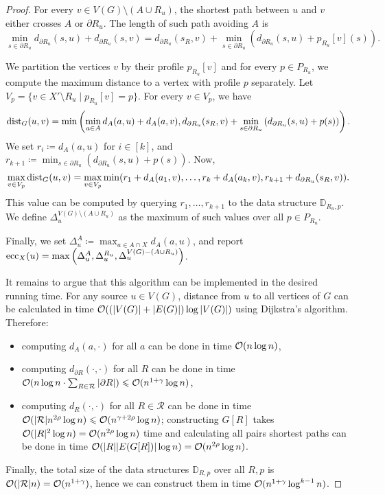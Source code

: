 \begin{proof}
    For every $v \in V(G) \setminus (A \cup R_u)$, the shortest path between $u$ and $v$ either crosses $A$ or $\partial R_u$. The length of such path avoiding $A$ is
    $$ \min_{s \in \partial R_u} d_{\partial R_u}(s, u) + d_{\partial R_u}(s, v) = 
       d_{\partial R_u}(s_R, v) + \min_{s \in \partial R_u} \left( d_{\partial R_u}(s, u) + p_{R_u}[v](s) \right). $$

We partition the vertices $v$ by their profile $p_{R_u}[v]$ and for every $p \in P_{R_u}$, we compute the maximum distance to a vertex with profile $p$ separately. Let $V_p = \{ v \in X' \setminus R_u \mid p_{R_u}[v] = p \}$. For every $v \in V_p$, we have
    $$ \mathrm{dist}_G(u, v) = \min \left( \min_{a \in A} d_A(a, u) + d_A(a, v), d_{\partial R_u}(s_R, v) + \min_{s \in \partial R_u} \left( d_{\partial R_u}(s, u) + p(s) \right) \right). $$
    We set $r_i \coloneqq d_A(a, u)$ for $i \in [k]$, and $r_{k + 1} \coloneqq \min_{s \in \partial R_u}  \left( d_{\partial R_u}(s, u) + p(s) \right)$. Now,
    $$ \max_{v \in V_p} \mathrm{dist}_G(u, v) = \max_{v \in V_p} \min(r_1 + d_A(a_1, v), \dots, r_k + d_A(a_k, v), r_{k + 1} + d_{\partial R_u}(s_R, v)).$$
    This value can be computed by querying $r_1, \dots, r_{k + 1}$ to the data structure $\mathbb{D}_{R_u, p}$. We define $\Delta^{V(G) \setminus (A \cup R_u)}_u$ as the maximum of such values over all $p \in P_{R_u}$.
    
    Finally, we set $\Delta^{A}_u \coloneqq \max_{a \in A \cap X} d_A(a, u)$, and report $\mathrm{ecc}_X(u) = \max \left(\Delta^{A}_u, \Delta^{R_u}_u, \Delta^{V(G) - (A \cup R_u)}_u \right)$.
    
    It remains to argue that this algorithm can be implemented in the desired running time. For any source $u \in V(G)$, distance from $u$ to all vertices of $G$ can be calculated in time $\mathcal{O}((|V(G)| + |E(G)|) \log |V(G)|)$ using Dijkstra's algorithm. Therefore:
    \begin{itemize}[nosep]
        \item computing $d_A(a,\cdot)$ for all $a$ can be done in time $\mathcal{O} (n \log n)$,
        \item computing $d_{\partial R}(\cdot,\cdot)$ for all $R$ can be done in time $\mathcal{O} (n\log n \cdot \sum_{R \in \mathcal{R}} |\partial R| ) \leqslant \mathcal{O} (n^{1 + \gamma} \log n)$,
        \item computing $d_R(\cdot,\cdot)$ for all $R \in \mathcal{R}$ can be done in time $\mathcal{O} (|\mathcal{R}| n^{2\rho} \log n) \leqslant \mathcal{O} (n^{\gamma + 2\rho} \log n)$; constructing $G[R]$ takes $\mathcal{O}(|R|^2 \log n) = \mathcal{O}(n^{2\rho} \log n)$ time and calculating all pairs shortest paths can be done in time $\mathcal{O}(|R||E(G[R])| \log n) = \mathcal{O}(n^{2\rho} \log n)$.
    \end{itemize}
    Finally, the total size of the data structures $\mathbb{D}_{R, p}$ over all $R, p$ is $\mathcal{O}(|\mathcal{R}| n) = \mathcal{O} (n^{1 + \gamma})$, hence we can construct them in time $\mathcal{O} (n^{1 + \gamma} \log^{k - 1} n)$.
    

\end{proof}
